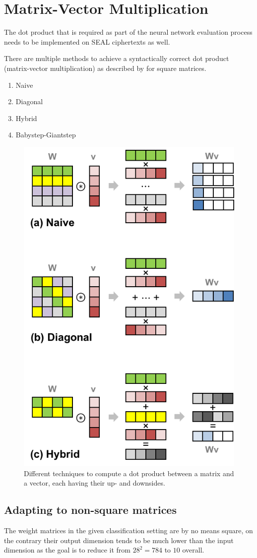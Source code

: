 \section{Matrix-Vector Multiplication}
The dot product that is required as part of the neural network evaluation process
needs to be implemented on SEAL ciphertexts as well.

There are multiple methods to achieve a syntactically correct dot product (matrix-vector multiplication)
as described by \textcite{2018-gazelle} for square matrices.

\begin{enumerate}
  \item Naive
  \item Diagonal
  \item Hybrid
  \item Babystep-Giantstep
\end{enumerate}

\begin{figure}
  \centering
  \includegraphics[width=0.4\linewidth]{figures/matrix-vector-multiplication-techniques.png}
  \caption[Image source: \cite{2018-gazelle}]{Different techniques to compute a dot product between a matrix and a vector,
    each having their up- and downsides.}
\end{figure}

\subsection{Adapting to non-square matrices}
The weight matrices in the given classification setting
are by no means square, on the contrary their output dimension tends
to be much lower than the input dimension as the goal is to reduce it from
$28^2 = 784$ to $10$ overall.

